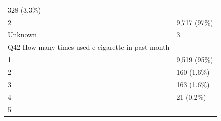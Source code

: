 \documentclass[]{article}
\begin{document}
\begin{longtable}[]{@{}ll@{}}
\begin{minipage}[t]{0.23\columnwidth}
328 (3.3\%)\strut
\end{minipage}\tabularnewline
\begin{minipage}[t]{0.71\columnwidth}\raggedright
2\strut
\end{minipage} & \begin{minipage}[t]{0.23\columnwidth}\raggedright
9,717 (97\%)\strut
\end{minipage}\tabularnewline
\begin{minipage}[t]{0.71\columnwidth}\raggedright
Unknown\strut
\end{minipage} & \begin{minipage}[t]{0.23\columnwidth}\raggedright
3\strut
\end{minipage}\tabularnewline
\begin{minipage}[t]{0.71\columnwidth}\raggedright
Q42 How many times used e-cigarette in past month\strut
\end{minipage} & \begin{minipage}[t]{0.23\columnwidth}\raggedright
\strut
\end{minipage}\tabularnewline
\begin{minipage}[t]{0.71\columnwidth}\raggedright
1\strut
\end{minipage} & \begin{minipage}[t]{0.23\columnwidth}\raggedright
9,519 (95\%)\strut
\end{minipage}\tabularnewline
\begin{minipage}[t]{0.71\columnwidth}\raggedright
2\strut
\end{minipage} & \begin{minipage}[t]{0.23\columnwidth}\raggedright
160 (1.6\%)\strut
\end{minipage}\tabularnewline
\begin{minipage}[t]{0.71\columnwidth}\raggedright
3\strut
\end{minipage} & \begin{minipage}[t]{0.23\columnwidth}\raggedright
163 (1.6\%)\strut
\end{minipage}\tabularnewline
\begin{minipage}[t]{0.71\columnwidth}\raggedright
4\strut
\end{minipage} & \begin{minipage}[t]{0.23\columnwidth}\raggedright
21 (0.2\%)\strut
\end{minipage}\tabularnewline
\begin{minipage}[t]{0.71\columnwidth}\raggedright
5\strut
\end{minipage} & \begin{minipage}[t]{0.23\columnwidth}\raggedright

\end{minipage}
\end{longtable}
\end{document}
